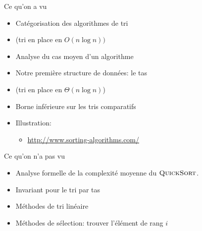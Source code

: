 \begin{frame}{Ce qu'on a vu}

\begin{itemize}
\item Catégorisation des algorithmes de tri
\item {} (tri en place en $O(n\log n))$
\item Analyse du cas moyen d'un algorithme
\item Notre première structure de données: le tas
\item {} (tri en place en $\Theta(n\log n)$)
\item Borne inférieure sur les tris comparatifs

\bigskip

\item Illustration:
\begin{itemize}
\item \url{http://www.sorting-algorithms.com/}
\end{itemize}

\end{itemize}

\end{frame}

\begin{frame}{Ce qu'on n'a pas vu}

\begin{itemize}
\item Analyse formelle de la complexité moyenne du $\textnormal{\scshape QuickSort}$.
\item Invariant pour le tri par tas
\item Méthodes de tri linéaire
\item Méthodes de sélection: trouver l'élément de rang $i$
\end{itemize}

\end{frame}
